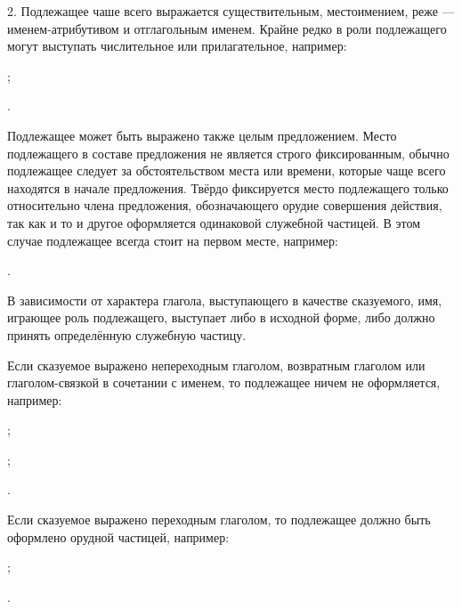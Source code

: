 2. Подлежащее чаше всего выражается существительным, местоимением, реже --- именем-атрибутивом и отглагольным именем. Крайне редко в роли подлежащего могут выступать числительное или прилагательное, например:
\begin{prfsample}
	\item {};
	\item {}.
\end{prfsample}
Подлежащее может быть выражено также целым предложением. Место подлежащего в составе предложения не является строго фиксированным, обычно подлежащее следует за обстоятельством места или времени, которые чаще всего находятся в начале предложения. Твёрдо фиксируется место подлежащего только относительно члена предложения, обозначающего орудие совершения действия, так как и то и другое оформляется одинаковой служебной частицей. В этом случае подлежащее всегда стоит на первом месте, например:
\begin{prfsample}
	\item {}.
\end{prfsample}

В зависимости от характера глагола, выступающего в качестве сказуемого, имя, играющее роль подлежащего, выступает либо в исходной форме, либо должно принять определённую служебную частицу.

Если сказуемое выражено непереходным глаголом, возвратным глаголом или глаголом-связкой в сочетании с именем, то подлежащее ничем не оформляется, например:
\begin{prfsample}
	\item {};
	\item {};
	\item {}.
\end{prfsample}

Если сказуемое выражено переходным глаголом, то подлежащее должно быть оформлено орудной частицей, например:
\begin{prfsample}
	\item {};
	\item {}.
\end{prfsample}

